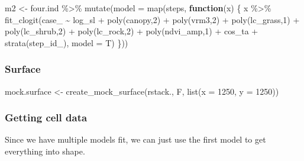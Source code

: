 \documentclass[
]{article}
\newenvironment{Shaded}{\begin{snugshade}}{\end{snugshade}}
\newcommand{\AttributeTok}[1]{\textcolor[rgb]{0.77,0.63,0.00}{#1}}
\newcommand{\ControlFlowTok}[1]{\textcolor[rgb]{0.13,0.29,0.53}{\textbf{#1}}}
\newcommand{\DecValTok}[1]{\textcolor[rgb]{0.00,0.00,0.81}{#1}}
\newcommand{\FunctionTok}[1]{\textcolor[rgb]{0.00,0.00,0.00}{#1}}
\newcommand{\NormalTok}[1]{#1}
\newcommand{\OtherTok}[1]{\textcolor[rgb]{0.56,0.35,0.01}{#1}}
\newcommand{\SpecialCharTok}[1]{\textcolor[rgb]{0.00,0.00,0.00}{#1}}
\begin{document}
\begin{Shaded}
\begin{Highlighting}[]
\NormalTok{m2 }\OtherTok{\textless{}{-}}\NormalTok{ four.ind }\SpecialCharTok{\%\textgreater{}\%}
  \FunctionTok{mutate}\NormalTok{(}\AttributeTok{model =} \FunctionTok{map}\NormalTok{(steps, }\ControlFlowTok{function}\NormalTok{(x) \{}
\NormalTok{    x }\SpecialCharTok{\%\textgreater{}\%} 
      \FunctionTok{fit\_clogit}\NormalTok{(case\_ }\SpecialCharTok{\textasciitilde{}}\NormalTok{ log\_sl }\SpecialCharTok{+} \FunctionTok{poly}\NormalTok{(canopy,}\DecValTok{2}\NormalTok{) }\SpecialCharTok{+} \FunctionTok{poly}\NormalTok{(vrm3,}\DecValTok{2}\NormalTok{) }\SpecialCharTok{+} \FunctionTok{poly}\NormalTok{(lc\_grass,}\DecValTok{1}\NormalTok{) }\SpecialCharTok{+} \FunctionTok{poly}\NormalTok{(lc\_shrub,}\DecValTok{2}\NormalTok{) }\SpecialCharTok{+} \FunctionTok{poly}\NormalTok{(lc\_rock,}\DecValTok{2}\NormalTok{) }\SpecialCharTok{+} \FunctionTok{poly}\NormalTok{(ndvi\_amp,}\DecValTok{1}\NormalTok{) }\SpecialCharTok{+}\NormalTok{ cos\_ta }\SpecialCharTok{+} \FunctionTok{strata}\NormalTok{(step\_id\_), }\AttributeTok{model =}\NormalTok{ T)}
\NormalTok{  \}))}
\end{Highlighting}
\end{Shaded}

\hypertarget{surface-2}{%
\subsubsection{Surface}\label{surface-2}}

\begin{Shaded}
\begin{Highlighting}[]
\NormalTok{mock.surface }\OtherTok{\textless{}{-}} \FunctionTok{create\_mock\_surface}\NormalTok{(rstack., F, }\FunctionTok{list}\NormalTok{(}\AttributeTok{x =} \DecValTok{1250}\NormalTok{, }\AttributeTok{y =} \DecValTok{1250}\NormalTok{))}
\end{Highlighting}
\end{Shaded}

\hypertarget{getting-cell-data-2}{%
\subsubsection{Getting cell data}\label{getting-cell-data-2}}

Since we have multiple models fit, we can just use the first model to
get everything into shape.
\end{document}
